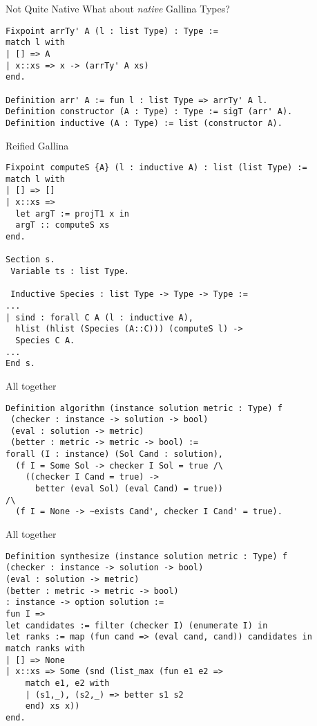 \documentclass{beamer}
\begin{document}
\begin{frame}[fragile]{Not Quite Native}
What about \emph{native} Gallina Types? 
\begin{verbatim}
Fixpoint arrTy' A (l : list Type) : Type :=
match l with 
| [] => A
| x::xs => x -> (arrTy' A xs)
end.
 
Definition arr' A := fun l : list Type => arrTy' A l.
Definition constructor (A : Type) : Type := sigT (arr' A).
Definition inductive (A : Type) := list (constructor A).
\end{verbatim}
\end{frame}

\begin{frame}[fragile]{Reified Gallina}
\begin{small}
\begin{verbatim}
Fixpoint computeS {A} (l : inductive A) : list (list Type) := 
match l with 
| [] => []
| x::xs => 
  let argT := projT1 x in 
  argT :: computeS xs
end.

Section s.
 Variable ts : list Type.

 Inductive Species : list Type -> Type -> Type := 
...
| sind : forall C A (l : inductive A), 
  hlist (hlist (Species (A::C))) (computeS l) -> 
  Species C A.
...
End s.
\end{verbatim}
\end{small}
\end{frame}

\begin{frame}[fragile]{All together}
\begin{small}
\begin{verbatim}
Definition algorithm (instance solution metric : Type) f 
 (checker : instance -> solution -> bool)
 (eval : solution -> metric) 
 (better : metric -> metric -> bool) := 
forall (I : instance) (Sol Cand : solution), 
  (f I = Some Sol -> checker I Sol = true /\ 
    ((checker I Cand = true) -> 
      better (eval Sol) (eval Cand) = true))
/\
  (f I = None -> ~exists Cand', checker I Cand' = true).
\end{verbatim}
\end{small}
\end{frame}

\begin{frame}[fragile]{All together}
\begin{small}
\begin{verbatim}
Definition synthesize (instance solution metric : Type) f 
(checker : instance -> solution -> bool) 
(eval : solution -> metric) 
(better : metric -> metric -> bool) 
: instance -> option solution := 
fun I => 
let candidates := filter (checker I) (enumerate I) in 
let ranks := map (fun cand => (eval cand, cand)) candidates in 
match ranks with 
| [] => None
| x::xs => Some (snd (list_max (fun e1 e2 => 
	match e1, e2 with 
	| (s1,_), (s2,_) => better s1 s2 
	end) xs x))
end.
\end{verbatim}
\end{small}
\end{frame}
\end{document}
